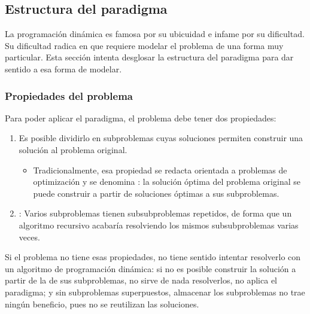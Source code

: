 \subsection{Estructura del paradigma}

La programación dinámica es famosa por su ubicuidad e infame por su dificultad. Su dificultad radica en que requiere modelar el problema de una forma muy particular. Esta sección intenta desglosar la estructura del paradigma para dar sentido a esa forma de modelar.

\subsubsection{Propiedades del problema}

Para poder aplicar el paradigma, el problema debe tener dos propiedades:
\begin{enumerate}
    \item Es posible dividirlo en subproblemas cuyas soluciones permiten construir una solución al problema original.
    \begin{itemize}
        \item Tradicionalmente, esa propiedad se redacta orientada a problemas de optimización y se denomina : la solución óptima del problema original se puede construir a partir de soluciones óptimas a sus subproblemas.
    \end{itemize} 
    \item {}: Varios subproblemas tienen subsubproblemas repetidos, de forma que un algoritmo recursivo acabaría resolviendo los mismos subsubproblemas varias veces.
\end{enumerate}

Si el problema no tiene esas propiedades, no tiene sentido intentar resolverlo con un algoritmo de programación dinámica: si no es posible construir la solución a partir de la de sus subproblemas, no sirve de nada resolverlos, no aplica el paradigma; y sin subproblemas superpuestos, almacenar los subproblemas no trae ningún beneficio, pues no se reutilizan las soluciones.

